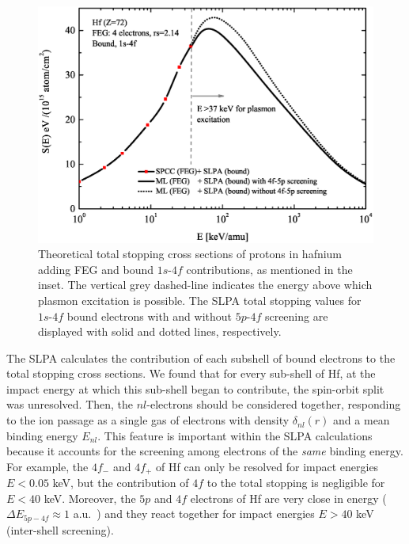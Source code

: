 \documentclass[aps,pra,reprint,groupedaddress,showpacs,showkeys]{revtex4-1}
\begin{document}
\begin{figure}[!t]
\centering
\includegraphics[width=13.cm]{Fig02.eps}
\caption{Theoretical total stopping cross sections of protons in hafnium 
adding FEG and bound $1s$-$4f$ contributions, as mentioned in the inset. 
The vertical grey dashed-line indicates the energy above which plasmon 
excitation is possible. The SLPA total stopping values for $1s$-$4f$ 
bound electrons with and without $5p$-$4f$ screening are displayed with 
solid and dotted lines, respectively.}
\label{slpa4f}
\end{figure}

The SLPA calculates the contribution of each subshell of bound electrons 
to the total stopping cross sections. We found that for every sub-shell 
of Hf, at the impact energy at which this sub-shell began to contribute, 
the spin-orbit split was unresolved. Then, the $nl$-electrons should be 
considered together, responding to the ion passage as a single gas of 
electrons with density $\delta_{nl}(r)$ and a mean binding energy 
$E_{nl}$. This feature is important within the SLPA calculations because 
it accounts for the screening among electrons of the \textit{same} 
binding energy. For example, the $4f_{-}$ and $4f_{+}$ of Hf can only 
be resolved for impact energies $E<0.05$ keV, but the contribution of 
$4f$ to the total stopping is negligible for $E<40$ keV. Moreover, the 
$5p$ and $4f$ electrons of Hf are very close in energy 
($\Delta E_{5p-4f} \approx 1$ a.u.~\cite{mendez2019}) and they react 
together for impact energies $E>40$ keV (inter-shell screening).
\end{document}
